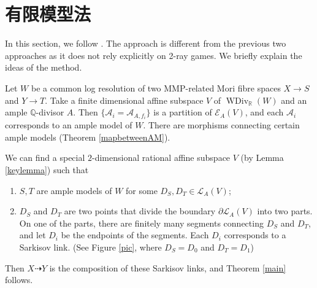 \chapter{有限模型法}\label{thirdmethod}
In this section, we follow \cite{haconSarkisovProgram2012}.
The approach is different from the previous two approaches as it does not rely explicitly on 2-ray games. We briefly explain the ideas of the method.

Let $W$ be a common log resolution of two MMP-related Mori fibre spaces $X\to S$ and $Y\to T$. Take a finite dimensional affine subspace $V$ of $\operatorname{WDiv}_{\mathbb{R}}(W)$ and an ample $\mathbb{Q}$-divisor $A$. Then $\{\mathcal{A}_{i} =\mathcal{A}_{A,f_{i}}\} $ is a partition of $\mathcal{E}_{A}(V)$, and each $\mathcal{A}_{i}$ corresponds to an ample model of $W$.    There are morphisms connecting certain ample models (Theorem \ref{mapbetweenAM}).

We can find a special $2$-dimensional rational affine subspace  $V$ (by Lemma \ref{keylemma}) such that
\begin{enumerate}
  \item $S,T$ are ample models of $W$ for some $D_{S},D_{T} \in \mathcal{L}_{A}(V) $;
    \item $D_{S}$ and $D_{T}$ are two points that divide the boundary $\partial \mathcal{L}_{A}(V)$ into two parts. On one of the parts, there are finitely many segments connecting $D_{S}$ and $D_{T}$, and let $D_{i}$ be the endpoints of the segments. Each $D_{i}$ corresponds to a Sarkisov link.
    (See Figure \ref{pic}, where $D_S=D_0$ and $D_T=D_1$)
    
\end{enumerate}

Then  $X\dashrightarrow Y$ is the composition of these Sarkisov links, and  Theorem \ref{main} follows.

